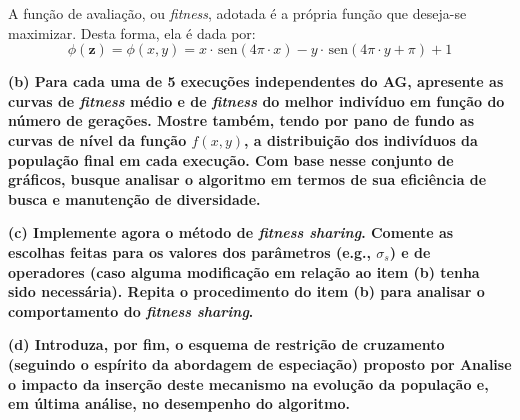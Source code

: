 \documentclass[a4paper, 12pt]{article}
\newcommand{\sen}{\hspace{2pt}\mathrm{sen}}
\newcommand{\fitness}{\textit{fitness}\xspace}
\newcommand{\fitsha}{\textit{fitness sharing}\xspace}
\begin{document}
A função de avaliação, ou \fitness, adotada é a própria função que deseja-se maximizar. Desta forma, ela é dada por:
\begin{equation}\label{eq:fitness}
    \phi(\bm{z}) = \phi(x, y) = x \cdot \sen(4\pi \cdot x) - y \cdot \sen(4\pi \cdot y + \pi) + 1
\end{equation}

\textbf{(b) Para cada uma de 5 execuções independentes do AG, apresente as curvas de \fitness médio e de \fitness do melhor indivíduo em função do número de gerações. Mostre também, tendo por pano de fundo as curvas de nível da função $f(x, y)$, a distribuição dos indivíduos da população final em cada execução. Com base nesse conjunto de gráficos, busque analisar o algoritmo em termos de sua eficiência de busca e manutenção de diversidade.}

\textbf{(c) Implemente agora o método de \fitsha. Comente as escolhas feitas para os valores dos parâmetros (e.g., $\sigma_s$) e de operadores (caso alguma modificação em relação ao item (b) tenha sido necessária). Repita o procedimento do item (b) para analisar o comportamento do \fitsha.}

\textbf{(d) Introduza, por fim, o esquema de restrição de cruzamento (seguindo o espírito da abordagem de especiação) proposto por \cite{deb1989genetic} Analise o impacto da inserção deste mecanismo na evolução da população e, em última análise, no desempenho do algoritmo.}

\clearpage





 
\end{document}
